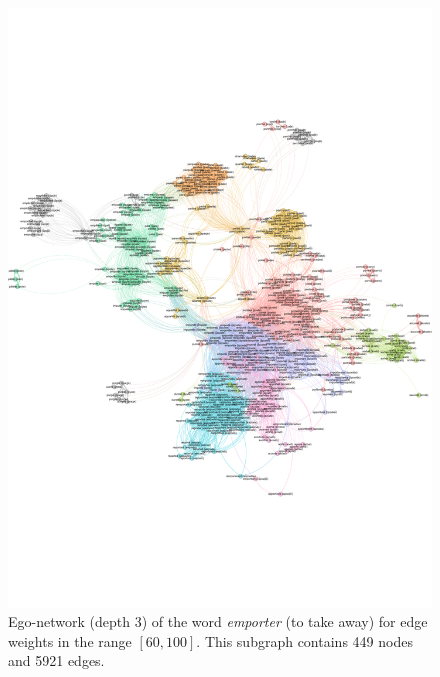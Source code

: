 \begin{figure}[t]
    \centering
    \includegraphics[width=\textwidth, trim=0cm 5.5cm 0cm 5.5cm, clip]{assets/emporter-ego.pdf}
    \caption{Ego-network (depth 3) of the word \textit{emporter} (to take away) for edge weights in the range $[60,100]$. This subgraph contains 449 nodes and 5921 edges.}
    \label{fig:emporter-ego}
\end{figure}

